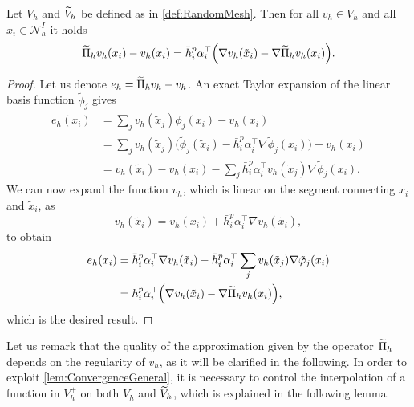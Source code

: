 \documentclass[10pt]{article}
\begin{document}
\begin{lemma}\label{lem:InterpPreliminary} Let $V_h$ and $\widetilde V_h$ be defined as in \cref{def:RandomMesh}. Then for all $v_h \in V_h$ and all $x_i \in \mathcal N_h^I$ it holds
	\begin{equation}
		\widetilde \Pi_h v_h(x_i) - v_h(x_i) = \bar h_i^p \alpha_i^\top \Big(\nabla v_h(\tilde x_i) - \nabla \widetilde \Pi_h v_h(x_i)\Big).
	\end{equation}
\end{lemma}
\begin{proof} Let us denote $e_h = \widetilde \Pi_h v_h - v_h$. An exact Taylor expansion of the linear basis function $\tilde \phi_j$ gives
\begin{equation}
\begin{aligned}
	e_h(x_i) &= \sum_{j} v_h(\tilde x_j) \phi_j(x_i) - v_h(x_i) \\
	&= \sum_j v_h(\tilde x_j) \Big(\tilde \phi_j(\tilde x_i) - \bar h_i^p \alpha_i^\top \nabla \tilde \phi_j(x_i)\Big) - v_h(x_i) \\
	&= v_h(\tilde x_i) - v_h(x_i) - \sum_j \bar h_i^p \alpha_i^\top v_h(\tilde x_j) \nabla \tilde \phi_j(x_i).
\end{aligned}
\end{equation}
We can now expand the function $v_h$, which is linear on the segment connecting $x_i$ and $\tilde x_i$, as
\begin{equation}\label{eq:TaylorVh}
	v_h(\tilde x_i) = v_h(x_i) + \bar h_i^p \alpha_i^\top \nabla v_h(\tilde x_i),
\end{equation}
to obtain
\begin{equation}
\begin{aligned}
	e_h(x_i) &= \bar h_i^p \alpha_i^\top \nabla v_h(\tilde x_i) - \bar h_i^p \alpha_i^\top \sum_j v_h(\tilde x_j) \nabla \tilde {\varphi}_j(x_i) \\
	&= \bar h_i^p \alpha_i^\top \Big(\nabla v_h(\tilde x_i) - \nabla \widetilde \Pi_h v_h(x_i)\Big),
\end{aligned}
\end{equation}
which is the desired result.
\end{proof}

Let us remark that the quality of the approximation given by the operator $\widetilde \Pi_h$ depends on the regularity of $v_h$, as it will be clarified in the following. In order to exploit \cref{lem:ConvergenceGeneral}, it is necessary to control the interpolation of a function in $V_h^+$ on both $V_h$ and $\widetilde V_h$, which is explained in the following lemma.
\end{document}
